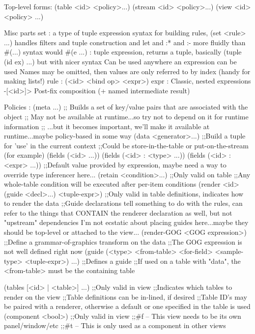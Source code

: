 Top-level forms:
  (table <id> <policy>...)
  (stream <id> <policy>...)
  (view <id> <policy> ...)
 
Misc parts
  set  : a type of tuple expression
         syntax for building rules,  (set <rule> ...)
         handles filters and tuple construction and let and :* and :- more fluidly than #(...) syntax would
  #(e ...) : tuple expression, returns a tuple, basically (tuple (id ex) ...) but with nicer syntax
             Can be used anywhere an expression can be used
             Names may be omitted, then values are only referred to by index (handy for making lists!)
  rule : (<id> <bind op> <expr>)
  expr : Classic, nested expressions
         -[<id>]>  Post-fix composition (+ named intermediate result)

Policies :
  (meta ...) 
     ;; Builds a set of key/value pairs that are associated with the object
     ;; May not be available at runtime...so try not to depend on it for runtime information
     ;; ...but it becomes important, we'll make it available at runtime...maybe policy-based in some way
  (data <generator>...)
     ;;Build a tuple for 'use' in the current context
     ;;Could be store-in-the-table or put-on-the-stream (for example)
  (fields (<id> ...))
  (fields (<id> : <type> ...))
  (fields (<id> : <expr> ...))   
      ;;Default value provided by expression, maybe need a way to override type inferencer here...
  (retain  <condition>...)
     ;;Only valid on table 
     ;;Any whole-table condition will be executed after per-item conditions
  (render <id> (guide <decl>...) <tuple-expr>)
     ;;Only valid in table definitions, indicates how to render the data
     ;;Guide declarations tell something to do with the rules,
        can refer to the things that CONTAIN the renderer declaration as
        well, but not "upstream" dependencies
        I'm not ecstatic about placing guides here...maybe they should be
        top-level or attached to the view...
  (render-GOG <GOG expression>)
    ;;Define a grammar-of-graphics transform on the data
    ;;The GOG expression is not well defined right now
  (guide (<type> <from-table> <for-field> <sample-type> <tuple-expr>) ...)
     ;;Defines a guide 
     ;;If used on a table with "data", the <from-table> must be the
       containing table
  
  (tables [<id> | <table>] ...)
     ;;Only valid in view
     ;;Indicates which tables to render on the view
     ;;Table definitions can be in-lined, if desired
     ;;Table ID's may be paired with a renderer,
        otherwise a default or one specified in the table is used
  (component <bool>)
     ;;Only valid in view
     ;;#f -- This view needs to be its own panel/window/etc
     ;;#t -- This is only used as a component in other views
       


